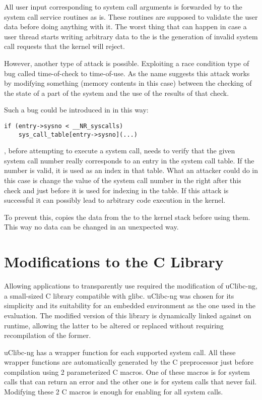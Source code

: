 All user input corresponding to system call arguments is forwarded by \memsc to
the system call service routines as is. These routines are supposed to validate
the user data before doing anything with it. The worst thing that can happen in
case a user thread starts writing arbitrary data to the \sysp is the generation
of invalid system call requests that the kernel will reject.

However, another type of attack is possible. Exploiting a race condition type
of bug called time-of-check to time-of-use. As the name suggests this attack
works by modifying something (memory contents in this case) between the
checking of the state of a part of the system and the use of the results of
that check.

Such a bug could be introduced in \memsc in this way:

\begin{verbatim}
if (entry->sysno < __NR_syscalls)
    sys_call_table[entry->sysno](...)
\end{verbatim}

\memsc, before attempting to execute a system call, needs to verify that the
given system call number really corresponds to an entry in the system call
table. If the number is valid, it is used as an index in that table.  What an
attacker could do in this case is change the value of the system call number in
the \sysp right after this check and just before it is used for indexing in the
table. If this attack is successful it can possibly lead to arbitrary code
execution in the kernel.

To prevent this, \memsc copies the data from the \sysp to the kernel stack
before using them. This way no data can be changed in an unexpected way.

\section{Modifications to the C Library}

Allowing applications to transparently use \memsc required the modification of
uClibc-ng, a small-sized C library compatible with glibc. uClibc-ng was chosen
for its simplicity and its suitability for an embedded environment as the one
used in the \memsc evaluation. The modified version of this library is
dynamically linked against \lib on runtime, allowing the latter to be altered
or replaced without requiring recompilation of the former.

uClibc-ng has a wrapper function for each supported system call. All these
wrapper functions are automatically generated by the C preprocessor just before
compilation using 2 parameterized C macros. One of these macros is for system
calls that can return an error and the other one is for system calls that never
fail. Modifying these 2 C macros is enough for enabling \memsc for all system
calls.

